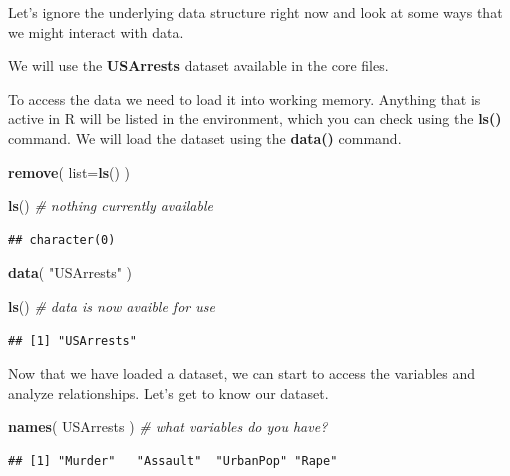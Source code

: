 \documentclass[]{book}
\newenvironment{Shaded}{\begin{snugshade}}{\end{snugshade}}
\newcommand{\CommentTok}[1]{\textcolor[rgb]{0.56,0.35,0.01}{\textit{#1}}}
\newcommand{\DataTypeTok}[1]{\textcolor[rgb]{0.13,0.29,0.53}{#1}}
\newcommand{\KeywordTok}[1]{\textcolor[rgb]{0.13,0.29,0.53}{\textbf{#1}}}
\newcommand{\NormalTok}[1]{#1}
\newcommand{\StringTok}[1]{\textcolor[rgb]{0.31,0.60,0.02}{#1}}
\theoremstyle{definition}
\theoremstyle{definition}
\theoremstyle{definition}
\theoremstyle{remark}
\begin{document}
Let's ignore the underlying data structure right now and look at some
ways that we might interact with data.

We will use the \textbf{USArrests} dataset available in the core files.

To access the data we need to load it into working memory. Anything that
is active in R will be listed in the environment, which you can check
using the \textbf{ls()} command. We will load the dataset using the
\textbf{data()} command.

\begin{Shaded}
\begin{Highlighting}[]
\KeywordTok{remove}\NormalTok{( }\DataTypeTok{list=}\KeywordTok{ls}\NormalTok{() )}
\end{Highlighting}
\end{Shaded}

\begin{Shaded}
\begin{Highlighting}[]
\KeywordTok{ls}\NormalTok{() }\CommentTok{# nothing currently available}
\end{Highlighting}
\end{Shaded}

\begin{verbatim}
## character(0)
\end{verbatim}

\begin{Shaded}
\begin{Highlighting}[]
\KeywordTok{data}\NormalTok{( }\StringTok{"USArrests"}\NormalTok{ )}

\KeywordTok{ls}\NormalTok{() }\CommentTok{# data is now avaible for use}
\end{Highlighting}
\end{Shaded}

\begin{verbatim}
## [1] "USArrests"
\end{verbatim}

Now that we have loaded a dataset, we can start to access the variables
and analyze relationships. Let's get to know our dataset.

\begin{Shaded}
\begin{Highlighting}[]
\KeywordTok{names}\NormalTok{( USArrests )  }\CommentTok{# what variables do you have?}
\end{Highlighting}
\end{Shaded}

\begin{verbatim}
## [1] "Murder"   "Assault"  "UrbanPop" "Rape"
\end{verbatim}
\end{document}
